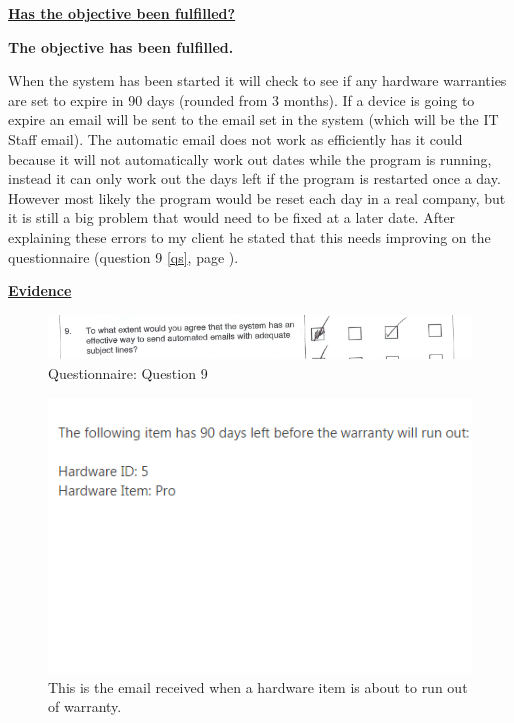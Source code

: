 \underline{\textbf{Has the objective been fulfilled?}}

\textbf{The objective has been fulfilled.}

When the system has been started it will check to see if any hardware warranties  are set to expire in 90 days (rounded from 3 months). If a device is going to expire an email will be sent to the email set in the system (which will be the IT Staff email). The automatic email does not work as efficiently has it could because it will not automatically work out dates while the program is running, instead it can only work out the days left if the program is restarted once a day. However most likely the program would be reset each day in a real company, but it is still a big problem that would need to be fixed at a later date. After explaining these errors to my client he stated that this needs improving on the questionnaire (question 9 \ref{qs}, page \pageref{qs}).

\underline{\textbf{Evidence}}

\begin{figure}[H]
    \includegraphics[width=\textwidth]{./Evaluation/EvaluationQuestionnaire/9.png}
    \caption{Questionnaire: Question 9} 
\end{figure}


\begin{figure}[H]
    \includegraphics[width=\textwidth]{./Testing/Images/EmailExpiredHardware.png}
    \caption{This is the email received when a hardware item is about to run out of warranty.} 
\end{figure}



